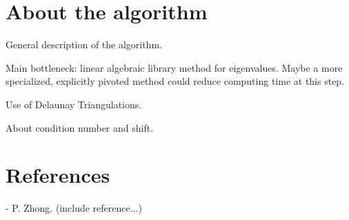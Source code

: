 \documentclass{article}
\begin{document}
	\section{About the algorithm}

	General description of the algorithm. 
	
	Main bottleneck: linear algebraic library method for eigenvalues.
	Maybe a more specialized, explicitly pivoted method could 
	reduce computing time at this step. 

	Use of Delaunay Triangulations. 
	
	About condition number and shift.

	
	\section{References}

	- P. Zhong. (include reference...)
	
\end{document}
